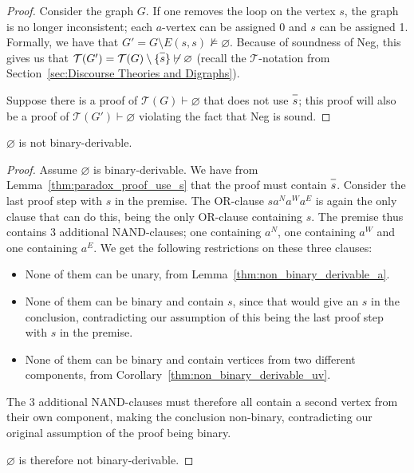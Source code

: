 \begin{proof}
  Consider the graph $G$.
  If one removes the loop on the vertex $s$, the graph is no longer inconsistent;
  each $a$-vertex can be assigned 0 and $s$ can be assigned 1.
  Formally, we have that $G' = G \setminus E(s,s) \not\vDash \varnothing$.
  Because of soundness of Neg, this gives us that $\mathcal{T}(G') = \mathcal{T}(G) \setminus \{\ol{s} \} \not\vdash \varnothing$ (recall the $\mathcal{T}$-notation from Section~\ref{sec:Discourse Theories and Digraphs}).

  Suppose there is a proof of $\mathcal{T}(G)\vdash \varnothing$ that does not use $\ol{s}$;
  this proof will also be a proof of $\mathcal{T}(G')\vdash \varnothing$ violating the fact that Neg is sound.
\end{proof}
\begin{theorem}
  $\varnothing$ is not binary-derivable.
  \label{thm:non_binary_derivable_paradox}
\end{theorem}
\begin{proof}
  Assume $\varnothing$ is binary-derivable.
  We have from Lemma~\ref{thm:paradox_proof_use_s} that the proof must contain $\ol{s}$.
  Consider the last proof step with $s$ in the premise.
  The OR-clause $sa^Na^Wa^E$ is again the only clause that can do this, being the only OR-clause containing $s$.
  The premise thus contains 3 additional NAND-clauses;
  one containing $a^N$, one containing $a^W$ and one containing $a^E$.
  We get the following restrictions on these three clauses:
  \begin{itemize}
    \item None of them can be unary, from Lemma~\ref{thm:non_binary_derivable_a}.
    \item None of them can be binary and contain $s$, since that would give an $s$ in the conclusion, contradicting our assumption of this being the last proof step with $s$ in the premise.
    \item None of them can be binary and contain vertices from two different components, from Corollary~\ref{thm:non_binary_derivable_uv}.
  \end{itemize}
  The 3 additional NAND-clauses must therefore all contain a second vertex from their own component,
  making the conclusion non-binary, contradicting our original assumption of the proof being binary.

  $\varnothing$ is therefore not binary-derivable.
\end{proof}
